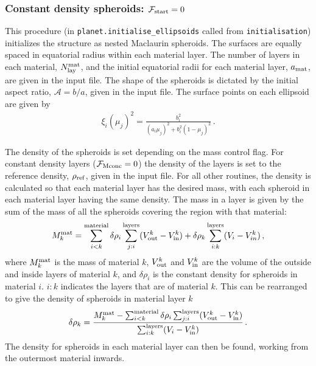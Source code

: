 \documentclass[11pt, oneside]{article}   	%
\begin{document}
\subsubsection{Constant density spheroids: $\mathcal{F}_{\rm start}=0$}
This procedure (in \texttt{planet.initialise\_ellipsoids} called from \texttt{initialisation}) initializes the structure as nested Maclaurin spheroids.
The surfaces are equally spaced in equatorial radius within each material layer. The number of layers in each material, $N_{\rm lay}^{\rm mat}$, and the initial equatorial radii for each material layer, $a_{\rm mat}$, are given in the input file. 
The shape of the spheroids is dictated by the initial aspect ratio, $\mathcal{A}=b/a$, given in the input file.
The surface points on each ellipsoid are given by
%
\begin{align}
\xi_i(\mu_j)^2=\frac{b_i^2}{\left(a_i\mu_j\right)^2 + b_i^2 \left (1 - \mu_j \right)^2} \, .
\end{align}
%

The density of the spheroids is set depending on the mass control flag.
For constant density layers ($\mathcal{F}_{\rm Mconc}=0$) the density of the layers is set to the reference density, $\rho_{\rm ref}$, given in the input file.
For all other routines, the density is calculated so that each material layer has the desired mass, with each spheroid in each material layer having the same density.
The mass in a layer is given by the sum of the mass of all the spheroids covering the region with that material:
%
\begin{align}
\begin{aligned}
M_{k} ^{\rm mat}=\sum_{i<k}^{\rm material} \delta\rho_i \sum_{j:i}^{\rm layers} (V_{\rm out}^k - V_{\rm in}^k) + \delta\rho_k \sum_{i:k}^{\rm layers}  (V_{i} - V_{in}^k) \, ,
\end{aligned}
\end{align}
%
where $M_k^{\rm mat}$ is the mass of material $k$, $V_{\rm out}^k$ and $V_{\rm in}^k$ are the volume of the outside and inside layers of material $k$, and $\delta\rho_i$ is the constant density for spheroids in material $i$. $i:k$ indicates the layers that are of material $k$.
This can be rearranged to give the density of spheroids in material layer $k$
%
\begin{align}
\begin{aligned}
\delta\rho_k  = \frac{M_{k}^{\rm mat} -\sum_{i<k}^{\rm material} \delta\rho_i \sum_{j:i}^{\rm layers} (V_{\rm out}^k - V_{\rm in}^k)}{\sum_{i:k}^{\rm layers} (V_{i} - V_{\rm in}^k)} \, .
\end{aligned}
\end{align}
%
The density for spheroids in each material layer can then be found, working from the outermost material inwards. 
\end{document}
